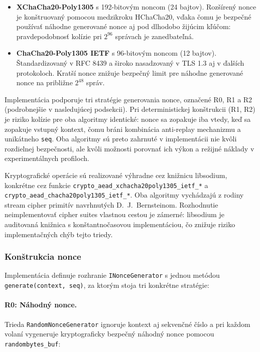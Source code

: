 \documentclass[journal,a4paper,onecolumn]{IEEEtran}
\begin{document}
\begin{itemize}[leftmargin=*,itemsep=2pt]
  \item \textbf{XChaCha20-Poly1305} s 192-bitovým noncom (24 bajtov). Rozšírený nonce je konštruovaný pomocou medzikroku HChaCha20, vďaka čomu je bezpečné používať náhodne generované nonce aj pod dlhodobo žijúcim kľúčom: pravdepodobnosť kolízie pri $2^{96}$ správach je zanedbateľná\cite{XChaChaDraft,LibsodiumXChaChaDoc}.
  \item \textbf{ChaCha20-Poly1305 IETF} s 96-bitovým noncom (12 bajtov). Štandardizovaný v RFC 8439 a široko nasadzovaný v TLS 1.3 aj v ďalších protokoloch\cite{RFC8439}. Kratší nonce znižuje bezpečný limit pre náhodne generované nonce na približne $2^{48}$ správ.
\end{itemize}

Implementácia podporuje tri stratégie generovania nonce, označené R0, R1 a R2 (podrobnejšie v nasledujúcej podsekcii). Pri deterministickej konštrukcii (R1, R2) je riziko kolízie pre oba algoritmy identické: nonce sa zopakuje iba vtedy, keď sa zopakuje vstupný kontext, čomu bráni kombinácia anti-replay mechanizmu a unikátneho \texttt{seq}. Oba algoritmy sú preto zahrnuté v implementácii nie kvôli rozdielnej bezpečnosti, ale kvôli možnosti porovnať ich výkon a režijné náklady v experimentálnych profiloch.

Kryptografické operácie sú realizované výhradne cez knižnicu libsodium, konkrétne cez funkcie \texttt{crypto\_aead\_xchacha20poly1305\_ietf\_*} a \texttt{crypto\_aead\_chacha20poly1305\_ietf\_*}. Oba algoritmy vychádzajú z rodiny stream cipher primitív navrhnutých D.~J.~Bernsteinom\cite{Bernstein2012}. Rozhodnutie neimplementovať cipher suites vlastnou cestou je zámerné: libsodium je auditovaná knižnica s konštantnočasovou implementáciou, čo znižuje riziko implementačných chýb tejto triedy\cite{LibsodiumXChaChaDoc}.

\subsubsection{Konštrukcia nonce}

Implementácia definuje rozhranie \texttt{INonceGenerator} s jednou metódou \texttt{generate(context, seq)}, za ktorým stoja tri konkrétne stratégie:

\paragraph{R0: Náhodný nonce.}
Trieda \texttt{RandomNonceGenerator} ignoruje kontext aj sekvenčné číslo a pri každom volaní vygeneruje kryptograficky bezpečný náhodný nonce pomocou \texttt{randombytes\_buf}:
\end{document}
